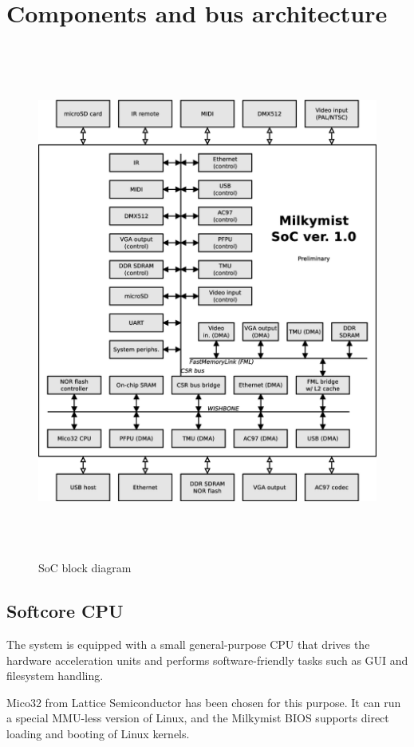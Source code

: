 \documentclass[a4paper,11pt]{article}
\begin{document}
\section{Components and bus architecture}

\begin{figure}[H]
\centering
\includegraphics[height=170mm]{soc_architecture.eps}
\caption{SoC block diagram}
\end{figure}

\subsection{Softcore CPU}
The system is equipped with a small general-purpose CPU that drives the hardware acceleration units and performs software-friendly tasks such as GUI and filesystem handling.

Mico32 from Lattice Semiconductor has been chosen for this purpose. It can run a special MMU-less version of Linux, and the Milkymist BIOS supports direct loading and booting of Linux kernels.
\end{document}
